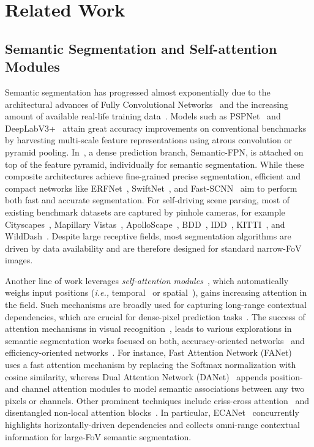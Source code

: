 \documentclass[journal]{IEEEtran}
\begin{document}
\section{Related Work}

\subsection{Semantic Segmentation and Self-attention Modules}

Semantic segmentation has progressed almost exponentially due to the architectural advances of Fully Convolutional Networks~\cite{fcn} and the increasing amount of available real-life training data~\cite{deep_multimodal}.
Models such as PSPNet~\cite{pspnet} and DeepLabV3+~\cite{deeplabv3+} attain great accuracy improvements on conventional benchmarks  by harvesting multi-scale feature representations using atrous convolution or pyramid pooling.
In~\cite{panopticfpn}, a dense prediction branch, Semantic-FPN, is attached on top of the feature pyramid, individually for semantic segmentation.
While these composite architectures achieve fine-grained precise segmentation, efficient and compact networks like ERFNet~\cite{erfnet}, SwiftNet~\cite{swiftnet}, and Fast-SCNN~\cite{fastscnn} aim to perform both fast and accurate segmentation.
For self-driving scene parsing, most of existing benchmark datasets are captured by pinhole cameras, for example Cityscapes~\cite{cityscapes}, Mapillary Vistas~\cite{mapillary}, ApolloScape~\cite{apolloscape}, BDD~\cite{bdd}, IDD~\cite{idd}, KITTI~\cite{kitti360}, and WildDash~\cite{wilddash}.
Despite large receptive fields, most segmentation algorithms are driven by data availability and are therefore designed for standard narrow-FoV images.

Another line of work leverages \emph{self-attention modules}~\cite{attention}, which automatically weighs input positions (\textit{i.e.,} temporal~\cite{attention} or spatial~\cite{nonlocal}), gains increasing attention in the field. Such mechanisms are broadly used for capturing long-range contextual dependencies, which are crucial for dense-pixel prediction tasks~\cite{zhang2021trans4trans}.
The success of attention mechanisms in visual recognition~\cite{nonlocal}, leads to various explorations in semantic segmentation works focused on both, accuracy-oriented networks~\cite{danet,ranet,ocrnet} and efficiency-oriented networks~\cite{fanet,omnirange,attanet}.
For instance, Fast Attention Network (FANet)~\cite{fanet} uses a fast attention mechanism by replacing the Softmax normalization with cosine similarity, whereas Dual Attention Network (DANet)~\cite{danet} appends position- and channel attention modules to model semantic associations between any two pixels or channels.
Other prominent techniques include criss-cross attention~\cite{ccnet} and disentangled non-local attention blocks~\cite{omnirange,dnl,annn}.
In particular, ECANet~\cite{omnirange} concurrently highlights horizontally-driven dependencies and collects omni-range contextual information for large-FoV semantic segmentation.
\end{document}
